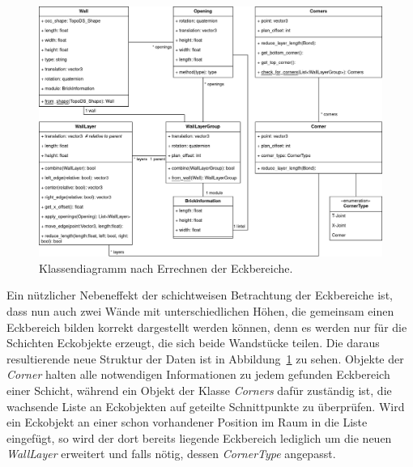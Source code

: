 \begin{figure}[hb]
  \centering
  \includegraphics[width=0.9\columnwidth]{fig/klassendiagramm_corners.drawio.png}
  \caption{Klassendiagramm nach Errechnen der Eckbereiche.}
  \label{fig:real:class_diagram_corners}
\end{figure}
Ein nützlicher Nebeneffekt der schichtweisen Betrachtung der Eckbereiche ist, dass nun auch zwei Wände mit unterschiedlichen Höhen, die gemeinsam einen Eckbereich bilden korrekt dargestellt werden können, denn es werden nur für die Schichten Eckobjekte erzeugt, die sich beide Wandstücke teilen.
Die daraus resultierende neue Struktur der Daten ist in Abbildung~\ref{fig:real:class_diagram_corners} zu sehen.
Objekte der \textit{Corner} halten alle notwendigen Informationen zu jedem gefunden Eckbereich einer Schicht, während ein Objekt der Klasse \textit{Corners} dafür zuständig ist, die wachsende Liste an Eckobjekten auf geteilte Schnittpunkte zu überprüfen.
Wird ein Eckobjekt an einer schon vorhandener Position im Raum in die Liste eingefügt, so wird der dort bereits liegende Eckbereich lediglich um die neuen \textit{WallLayer} erweitert und falls nötig, dessen \textit{CornerType} angepasst.


